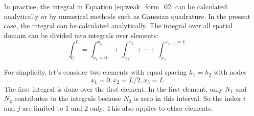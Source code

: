 In practice, the integral in Equation \eqref{eq:weak_form_02} can be
calculated analytically or by numerical methods such as Gaussian quadrature.
In the present case, the integral can be calculated analytically.
The integral over all spatial
domain can be divided into integrals over elements:
\begin{equation}
\int_{0}^{L} = \int_{x_{1}=0}^{x_{2}} + \int_{x_{2}}^{x_{3}} + \cdots +
\int_{x_{n}}^{x_{n+1}=L}
\end{equation}

For simplicity, let's consider two elements with equal spacing
$h_{1} = h_{2}$ with nodes
\begin{equation}
x_{1} = 0, x_{2} = L/2, x_{3} = L
\end{equation}
The first integral is done over the first element. In the first element, only
$N_{1}$ and $N_{2}$ contributes to the integrals because $N_{3}$ is zero in
this interval. So the index $i$ and $j$ are limited to 1 and 2 only.
This also applies to other elements.


